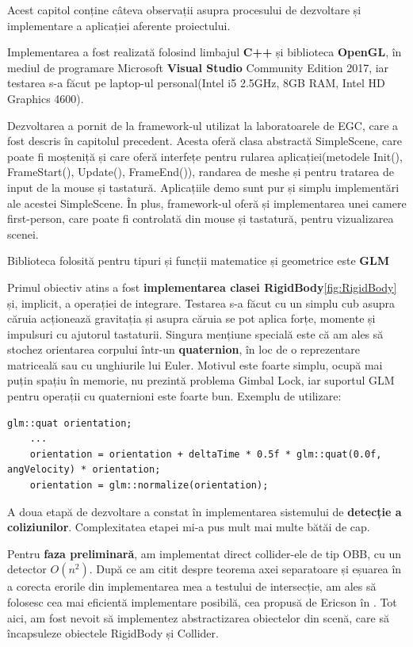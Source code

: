 \documentclass[12pt,a4paper]{report}
\begin{document}
Acest capitol conține câteva observații asupra procesului de dezvoltare și implementare a aplicației aferente proiectului.

Implementarea a fost realizată folosind limbajul \textbf{C++} și biblioteca \textbf{OpenGL}, în mediul de programare Microsoft \textbf{Visual Studio} Community Edition 2017, iar testarea s-a făcut pe laptop-ul personal(Intel i5 2.5GHz, 8GB RAM, Intel HD Graphics 4600).

Dezvoltarea a pornit de la framework-ul utilizat la laboratoarele de EGC, care a fost descris în capitolul precedent. Acesta oferă clasa abstractă SimpleScene, care poate fi moșteniță și care oferă interfețe pentru rularea aplicației(metodele Init(), FrameStart(), Update(), FrameEnd()), randarea de meshe și pentru tratarea de input de la mouse și tastatură. Aplicațiile demo sunt pur și simplu implementări ale acestei SimpleScene. În plus, framework-ul oferă și implementarea unei camere first-person, care poate fi controlată din mouse și tastatură, pentru vizualizarea scenei.

Biblioteca folosită pentru tipuri și funcții matematice și geometrice este \textbf{GLM}


Primul obiectiv atins a fost \textbf{implementarea clasei RigidBody}\ref{fig:RigidBody} și, implicit, a operației de integrare. Testarea s-a făcut cu un simplu cub asupra căruia acționează gravitația și asupra căruia se pot aplica forțe, momente și impulsuri cu ajutorul tastaturii. Singura mențiune specială este că am ales să stochez orientarea corpului într-un \textbf{quaternion}, în loc de o reprezentare matriceală sau cu unghiurile lui Euler. Motivul este foarte simplu, ocupă mai puțin spațiu în memorie, nu prezintă problema Gimbal Lock\cite{quaternions}, iar suportul GLM pentru operații cu quaternioni este foarte bun. Exemplu de utilizare:
\begin{lstlisting}[style=myC++]
	glm::quat orientation;
	...
	orientation = orientation + deltaTime * 0.5f * glm::quat(0.0f, angVelocity) * orientation;
	orientation = glm::normalize(orientation);
\end{lstlisting}


A doua etapă de dezvoltare a constat în implementarea sistemului de \textbf{detecție a coliziunilor}. Complexitatea etapei mi-a pus mult mai multe bătăi de cap.

Pentru \textbf{faza preliminară}, am implementat direct collider-ele de tip OBB, cu un detector $O(n^2)$. După ce am citit despre teorema axei separatoare și eșuarea în a corecta erorile din implementarea mea a testului de intersecție, am ales să folosesc cea mai eficientă implementare posibilă, cea propusă de Ericson în \cite[Secțiunea 4.4 \textit{Oriented Bounding Boxes(OBBs)}]{real_time_collision_detection}. Tot aici, am fost nevoit să implementez abstractizarea obiectelor din scenă, care să încapsuleze obiectele RigidBody și Collider.
\end{document}
